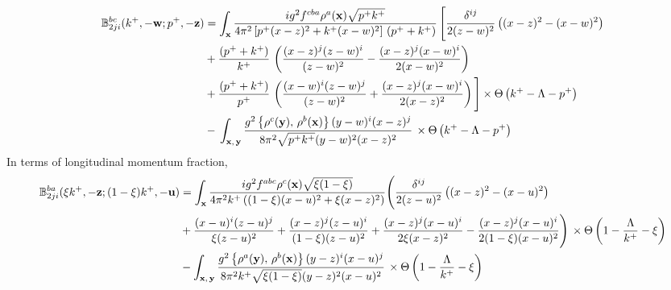 \documentclass[aps,prd,amsmath,amssymb,nofootinbib]{revtex4-2}
\def\mf#1{\mathbb{#1}}
\def\v#1{\mathbf{#1}}
\numberwithin{equation}{section}
\begin{document}
\begin{align}
     \mf{B}^{bc}_{2ji}(k^{+}, -\v{w}; p^{+}, -\v{z}) & =    \int_{\mathbf{x}}\frac{ig^{2}f^{cba}\rho^{a}(\mathbf{x})\sqrt{p^{+}k^{+}}}{4\pi^{2}\left[p^{+}(x-z)^{2}+k^{+} (x-w)^{2}\right]\,(p^{+}+k^{+})}\,\Bigg[\frac{\delta^{ij}}{2(z-w)^{2}}\left((x-z)^{2}-(x-w)^{2}\right)\notag \\ & +\frac{(p^{+}+k^{+})}{k^{+}}\,\left(\frac{(x-z)^{j}(z-w)^{i}}{(z-w)^{2}}-\frac{(x-z)^{j}(x-w)^{i}}{2(x-w)^{2}}\right)\notag \\ & +\frac{(p^{+}+k^{+})}{p^{+}}\,\left(\frac{(x-w)^{i}(z-w)^{j}}{(z-w)^{2}} +\frac{(x-z)^{j}(x-w)^{i}}{2(x-z)^{2}}\right)\Bigg]\times \Theta\left(k^{+}-\Lambda-p^{+}\right) \notag \\ & -\,\int_{\mathbf{x},\,\mathbf{y}}\frac{g^{2}\left\{ \rho^{c}(\mathbf{y}),\,\rho^{b}(\mathbf{x})\right\} (y-w)^{i}(x-z)^{j}}{8\pi^{2}\sqrt{p^{+}k^{+}}(y-w)^{2}(x-z)^{2}}\,\times \Theta\left(k^{+}-\Lambda-p^{+}\right)
\end{align}
In terms of longitudinal momentum fraction,
\begin{align}
     \mf{B}^{ba}_{2ji}(\xi k^{+}, -\v{z}; (1-\xi)k^{+}, -\v{u}) & = \int_{\mathbf{x}}\frac{ig^{2}f^{abc}\rho^{c}(\mathbf{x})\sqrt{\xi(1-\xi)}}{4\pi^{2}k^{+}\left((1-\xi)(x-u)^{2}+\xi (x-z)^{2}\right)}\Bigg(\frac{\delta^{ij}}{2(z-u)^{2}}\left((x-z)^{2}-(x-u)^{2}\right)\notag \\ & +\frac{(x-u)^{i}(z-u)^{j}}{\xi (z-u)^{2}}+\frac{(x-z)^{j}(z-u)^{i}}{(1-\xi)(z-u)^{2}}+\frac{(x-z)^{j}(x-u)^{i}}{2\xi (x-z)^{2}} -\frac{(x-z)^{j}(x-u)^{i}}{2(1-\xi)(x-u)^{2}}\Bigg)\,\times\Theta\left(1-\frac{\Lambda}{k^{+}}-\xi\right)\notag \\ & -\int_{\mathbf{x},\,\mathbf{y}}\frac{g^{2}\left\{ \rho^{a}(\mathbf{y}),\,\rho^{b}(\mathbf{x})\right\} (y-z)^{i}(x-u)^{j}}{8\pi^{2}k^{+}\sqrt{\xi(1-\xi)}(y-z)^{2}(x-u)^{2}}\,\times\Theta\left(1-\frac{\Lambda}{k^{+}}-\xi\right)
\end{align}
\end{document}
